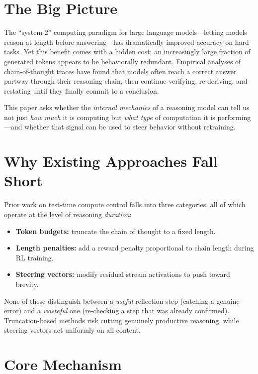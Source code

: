 \documentclass[10pt,twocolumn]{article}
\begin{document}
\section{The Big Picture}

The ``system-2'' computing paradigm for large language models---letting models reason at length before answering---has dramatically improved accuracy on hard tasks.
Yet this benefit comes with a hidden cost: an increasingly large fraction of generated tokens appears to be behaviorally redundant.
Empirical analyses of chain-of-thought traces have found that models often reach a correct answer partway through their reasoning chain, then continue verifying, re-deriving, and restating until they finally commit to a conclusion.

This paper asks whether the \emph{internal mechanics} of a reasoning model can tell us not just \emph{how much} it is computing but \emph{what type} of computation it is performing---and whether that signal can be used to steer behavior without retraining.

\section{Why Existing Approaches Fall Short}

Prior work on test-time compute control falls into three categories, all of which operate at the level of reasoning \emph{duration}:

\begin{itemize}[leftmargin=1em,itemsep=2pt]
  \item \textbf{Token budgets:} truncate the chain of thought to a fixed length.
  \item \textbf{Length penalties:} add a reward penalty proportional to chain length during RL training.
  \item \textbf{Steering vectors:} modify residual stream activations to push toward brevity.
\end{itemize}

None of these distinguish between a \emph{useful} reflection step (catching a genuine error) and a \emph{wasteful} one (re-checking a step that was already confirmed).
Truncation-based methods risk cutting genuinely productive reasoning, while steering vectors act uniformly on all content.

\section{Core Mechanism}
\end{document}
